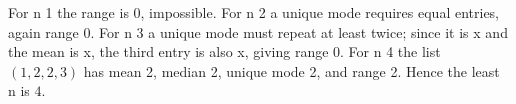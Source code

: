 For n 1 the range is 0, impossible. For n 2 a unique mode requires equal entries, again range 0. For n 3 a unique mode must repeat at least twice; since it is x and the mean is x, the third entry is also x, giving range 0. For n 4 the list $(1,2,2,3)$ has mean 2, median 2, unique mode 2, and range 2. Hence the least n is $\boxed 4$.
